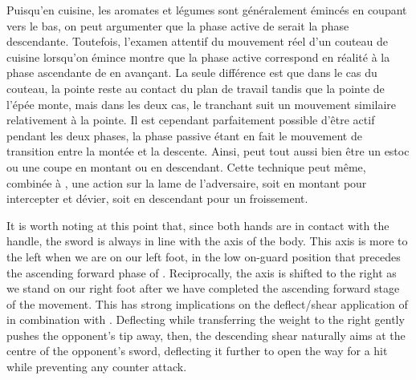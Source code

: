 Puisqu'en cuisine, les aromates et légumes sont généralement émincés en coupant vers le bas, on peut argumenter que la phase active de \Duo{} serait la phase descendante. Toutefois, l'examen attentif du mouvement réel d'un couteau de cuisine lorsqu'on émince montre que la phase active correspond en réalité à la phase ascendante de \Duo{} en avançant. La seule différence est que dans le cas du couteau, la pointe reste au contact du plan de travail tandis que la pointe de l'épée monte, mais dans les deux cas, le tranchant suit un mouvement similaire relativement à la pointe.
Il est cependant parfaitement possible d'être actif pendant les deux phases, la phase passive étant en fait le mouvement de transition entre la montée et la descente. Ainsi, \Duo{} peut tout aussi bien être un estoc ou une coupe en montant ou en descendant. Cette technique peut même, combinée à \Mo{}, une action sur la lame de l'adversaire, soit en montant pour intercepter et dévier, soit en descendant pour un froissement. 

It is worth noting at this point that, since both hands are in contact with the handle, the sword is always in line with the axis of the body. This axis is more to the left when we are on our left foot, in the low on-guard position that precedes the ascending forward phase of \Duo{}. Reciprocally, the axis is shifted to the right as we stand on our right foot after we have completed the ascending forward stage of the movement. This has strong implications on the deflect/shear application of  \Duo{} in combination with \Mo{}. Deflecting while transferring the weight to the right gently pushes the opponent's tip away, then, the descending shear naturally aims at the centre of the opponent's sword, deflecting it further to open the way for a hit while preventing any counter attack. 


